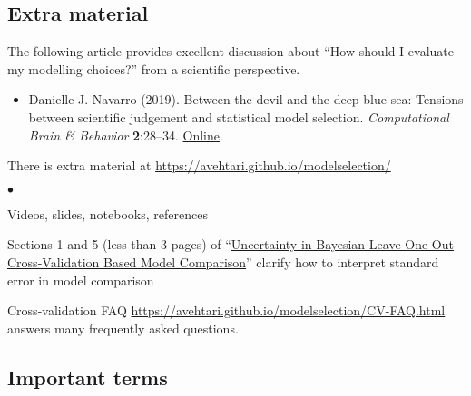 \documentclass[a4paper,11pt,english]{article}
\begin{document}
\subsection*{Extra material}

\noindent
The following article provides excellent discussion about ``How should I evaluate my modelling choices?'' from a scientific perspective.
\begin{itemize}
\item 
  Danielle J. Navarro (2019). Between the devil and the deep blue
  sea: Tensions between scientific judgement and statistical model
  selection. \textit{Computational Brain \& Behavior}
  \textbf{2}:28--34. \href{https://doi.org/10.1007/s42113-018-0019-z}{Online}.
\end{itemize}

\noindent
There is extra material at \url{https://avehtari.github.io/modelselection/}
\begin{list}{$\bullet$}{\parsep=0pt\itemsep=2pt}
\item Videos, slides, notebooks, references
\item Sections 1 and 5 (less than 3 pages) of
  ``\href{https://arxiv.org/abs/2008.10296}{Uncertainty in Bayesian
    Leave-One-Out Cross-Validation Based Model Comparison}'' clarify
  how to interpret standard error in model comparison
\item Cross-validation FAQ
  \url{https://avehtari.github.io/modelselection/CV-FAQ.html} answers
  many frequently asked questions.
\end{list}

\subsection*{Important terms}
\end{document}
